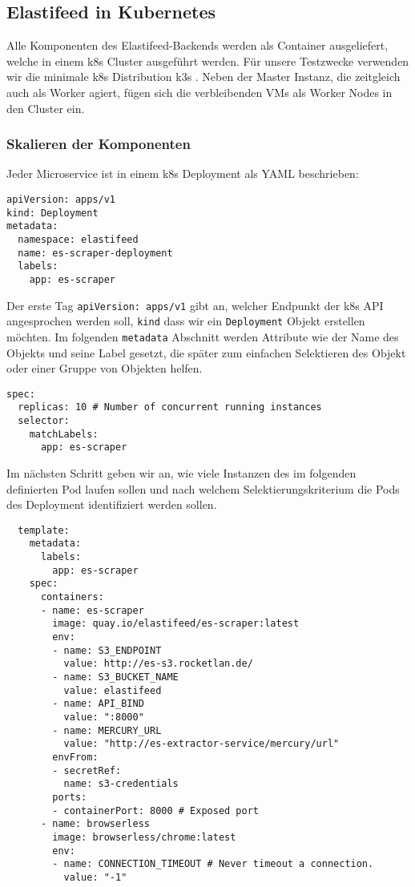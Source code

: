 \subsection{Elastifeed in Kubernetes}

Alle Komponenten des Elastifeed-Backends werden als Container ausgeliefert, welche in einem \ac{k8s} Cluster ausgeführt werden.
Für unsere Testzwecke verwenden wir die minimale \ac{k8s} Distribution k3s \cite{k3s}.
Neben der Master Instanz, die zeitgleich auch als Worker agiert, fügen sich die verbleibenden VMs als Worker Nodes in den Cluster ein.

\subsubsection{Skalieren der Komponenten}

Jeder Microservice ist in einem \ac{k8s} Deployment als YAML beschrieben:
\begin{verbatim}
apiVersion: apps/v1
kind: Deployment
metadata:
  namespace: elastifeed
  name: es-scraper-deployment
  labels:
    app: es-scraper
\end{verbatim}
Der erste Tag \texttt{apiVersion: apps/v1} gibt an, welcher Endpunkt der \ac{k8s} API angesprochen werden soll, \texttt{kind} dass wir ein \texttt{Deployment} Objekt erstellen möchten.
Im folgenden \texttt{metadata} Abschnitt werden Attribute wie der Name des Objekts und seine Label gesetzt, die später zum einfachen Selektieren des Objekt oder einer Gruppe von Objekten helfen.

\begin{verbatim}
spec:
  replicas: 10 # Number of concurrent running instances
  selector:
    matchLabels:
      app: es-scraper
\end{verbatim}

Im nächsten Schritt geben wir an, wie viele Instanzen des im folgenden definierten Pod laufen sollen und nach welchem Selektierungskriterium die Pods des Deployment identifiziert werden sollen.

\begin{verbatim}
  template:
    metadata:
      labels:
        app: es-scraper
    spec:
      containers:
      - name: es-scraper
        image: quay.io/elastifeed/es-scraper:latest
        env:
        - name: S3_ENDPOINT
          value: http://es-s3.rocketlan.de/
        - name: S3_BUCKET_NAME
          value: elastifeed
        - name: API_BIND
          value: ":8000"
        - name: MERCURY_URL
          value: "http://es-extractor-service/mercury/url"
        envFrom:
        - secretRef:
          name: s3-credentials
        ports:
        - containerPort: 8000 # Exposed port
      - name: browserless
        image: browserless/chrome:latest
        env:
        - name: CONNECTION_TIMEOUT # Never timeout a connection.
          value: "-1"
\end{verbatim}

